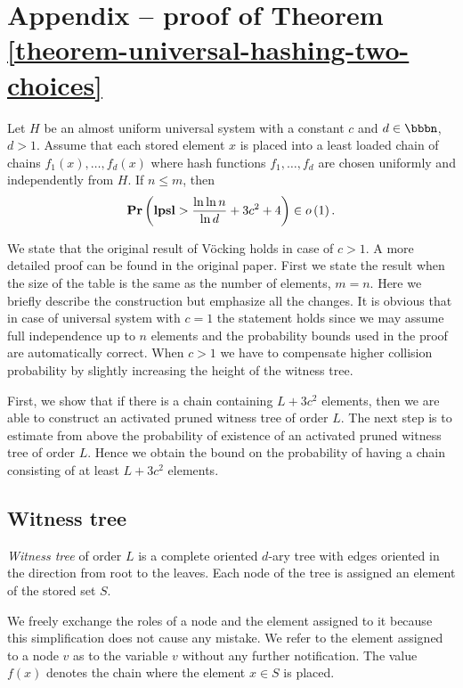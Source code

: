 \section*{Appendix -- proof of Theorem \ref{theorem-universal-hashing-two-choices}}
\setcounter{theorem}{3}

\begin{theorem}
Let $H$ be an almost uniform universal system with a constant $c$ and $d \in \bbbn$, $d > 1$. Assume that each stored element $x$ is placed into a least loaded chain of chains $f_1(x), \dots, f_d(x)$ where hash functions $f_1, \dots, f_d$ are chosen uniformly and independently from $H$. If $n \leq m$, then $$\mathbf{Pr}\left(\mathbf{lpsl} > \frac{\ln \ln n}{\ln d} + 3c^2 + 4\right) \in o\left(1\right).$$
\end{theorem}

We state that the original result \cite{DBLP:journals/jacm/Vocking03} of Vöcking holds in case of $c > 1$.
A more detailed proof can be found in the original paper. 
First we state the result when the size of the table is the same as the number of elements, $m = n$.
Here we briefly describe the construction but emphasize all the changes.
It is obvious that in case of universal system with $c = 1$ the statement holds since we may assume full independence up to $n$ elements and the probability bounds used in the proof are automatically correct.
When $c > 1$ we have to compensate higher collision probability by slightly increasing the height of the witness tree.

First, we show that if there is a chain containing $L + 3c^2$ elements, then we are able to construct an activated pruned witness tree of order $L$.
The next step is to estimate from above the probability of existence of an activated pruned witness tree of order $L$.
Hence we obtain the bound on the probability of having a chain consisting of at least $L + 3c^2$ elements.

\subsection{Witness tree}
\begin{definition}
\emph{Witness tree} of order $L$ is a complete oriented $d$-ary tree with edges oriented in the direction from root to the leaves. Each node of the tree is assigned an element of the stored set $S$.
\end{definition}

We freely exchange the roles of a node and the element assigned to it because this simplification does not cause any mistake.
We refer to the element assigned to a node $v$ as to the variable $v$ without any further notification.
The value $f(x)$ denotes the chain where the element $x \in S$ is placed.

